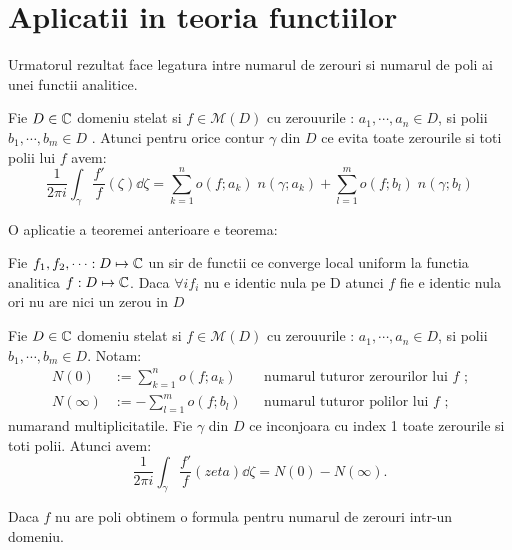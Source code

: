 \section{Aplicatii in teoria functiilor}

Urmatorul rezultat face legatura intre numarul de zerouri si numarul de poli ai unei functii analitice.

\begin{theorem}
    Fie $D \in \mathbb{C}$ domeniu stelat si $f \in \mathcal{M}(D)$ cu zerouurile :
    $a_1, \cdots , a_n \in D$, si polii $b_1, \cdots, b_m \in D$ .
    Atunci pentru orice contur $\gamma$ din $D$ ce evita toate zerourile
    si toti polii lui $f$ avem:
    \[
        \frac{1}{2\pi i} \int_{\gamma} \frac{f'}{f}(\zeta) \dd \zeta
        = \sum_{k=1}^{n} o(f; a_k)\; n(\gamma;a_k)
        + \sum_{l=1}^{m} o(f; b_l)\; n(\gamma;b_l)
    \]
\end{theorem}

O aplicatie a teoremei anterioare e teorema:

\begin{theorem}[Hurwitz]
    Fie $f_1, f_2, \cdots : D \mapsto \mathbb{C}$ un sir de functii ce converge local uniform
    la functia analitica $f : D \mapsto \mathbb{C}$. Daca $\forall i f_i $ nu e identic nula pe D
    atunci $f$ fie e identic nula ori nu are nici un zerou in $D$
\end{theorem}

\begin{theorem}
    Fie $D \in \mathbb{C}$ domeniu stelat si $f \in \mathcal{M}(D)$ cu zerouurile :
    $a_1, \cdots , a_n \in D$, si polii $b_1, \cdots, b_m \in D$.
    Notam:
    \begin{align*}
        N(0) &:= \sum_{k=1}^{n} o(f;a_k) && \text{numarul tuturor zerourilor lui } f \text{ ;} \\
        N(\infty) &:= - \sum_{l=1}^{m} o(f;b_l) && \text{numarul tuturor polilor lui } f \text{ ;}
    \end{align*}
    numarand multiplicitatile.  Fie $\gamma$ din $D$ ce inconjoara cu index 1 toate
    zerourile si toti polii. Atunci avem:
    \[
        \frac{1}{2\pi i} \int_{\gamma} \frac{f'}{f} (zeta) \dd \zeta = N(0) - N(\infty) .
    \]
\end{theorem}

Daca $f$ nu are poli obtinem o formula pentru numarul de zerouri intr-un domeniu.

